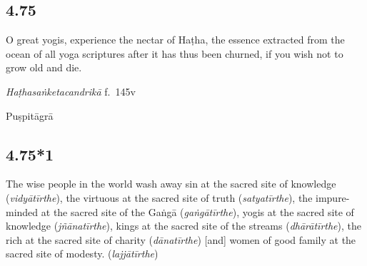 \begin{ekdosis}


\subsection*{4.75}
\begin{translation}[hp04_075]
O great yogis, experience the nectar of Haṭha, the essence extracted from the ocean of all yoga scriptures after it has thus been churned, if you wish not to grow old and die.
\end{translation} %


\begin{testimonia}[hp04_075]
\emph{Haṭhasaṅketacandrikā} f.~145v
\begin{versinnote}
\end{versinnote}
\end{testimonia}

\begin{philcomm}[hp04_075]
\end{philcomm}

\begin{metre}[hp04_075]
Puṣpitāgrā
\end{metre}

\subsection*{4.75*1}
\begin{translation}[hp04_75_1] The wise people in the world wash away sin at the sacred site of knowledge (\emph{vidyātīrthe}), the virtuous at the sacred site of truth (\emph{satyatīrthe}), the impure-minded at the sacred site of the Gaṅgā (\emph{gaṅgātīrthe}), yogis at the sacred site of knowledge (\emph{jñānatīrthe}), kings at the sacred site of the streams (\emph{dhārātīrthe}), the rich at the sacred site of charity (\emph{dānatīrthe}) [and] women of good family at the sacred site of modesty. (\emph{lajjātīrthe})
\end{translation}
%


\end{ekdosis}
